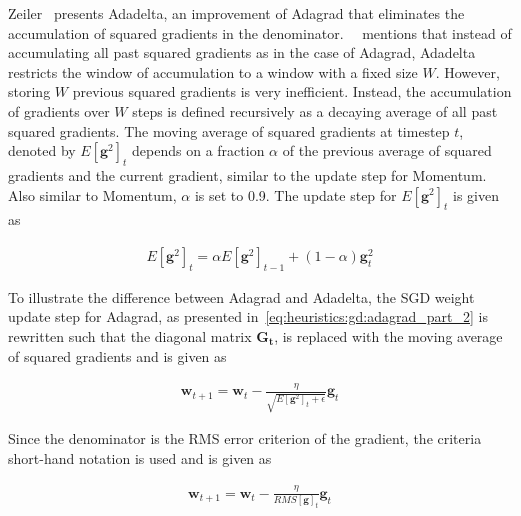 Zeiler~\cite{ref:zeiler:2012} presents \acs{Adadelta}, an improvement of \acs{Adagrad} that eliminates the accumulation of squared gradients in the denominator.~\citeauthor{ref:ruder:2016}~\cite{ref:ruder:2016} mentions that instead of accumulating all past squared gradients as in the case of \acs{Adagrad}, \acs{Adadelta} restricts the window of accumulation to a window with a fixed size $W$. However, storing $W$ previous squared gradients is very inefficient. Instead, the accumulation of gradients over $W$ steps is defined recursively as a decaying average of all past squared gradients. The moving average of squared gradients at timestep $t$, denoted by $E[\boldsymbol{g}^{2}]_{t}$  depends on a fraction $\alpha$ of the previous average of squared gradients and the current gradient, similar to the update step for \acs{Momentum}. Also similar to \acs{Momentum}, $\alpha$ is set to 0.9. The update step for $E[\boldsymbol{g}^{2}]_{t}$ is given as

\begin{equation}
      \label{eq:heuristics:gd:adadelta_part_1}
      \begin{split}
            E[\boldsymbol{g}^{2}]_{t} = \alpha E[\boldsymbol{g}^{2}]_{t - 1} + (1 - \alpha)\boldsymbol{g}_{t}^{2}
      \end{split}
\end{equation}

To illustrate the difference between \acs{Adagrad} and \acs{Adadelta}, the \acs{SGD} weight update step for \acs{Adagrad}, as presented in~\eqref{eq:heuristics:gd:adagrad_part_2} is rewritten such that the diagonal matrix $\boldsymbol{G_{t}}$, is replaced with the moving average of squared gradients and is given as

\begin{equation}
      \label{eq:heuristics:gd:adadelta_part_2}
      \begin{split}
            \boldsymbol{w}_{t+1} = \boldsymbol{w}_{t} - \frac{\eta}{\sqrt{E[\boldsymbol{g}^{2}]_{t} + \epsilon}} \boldsymbol{g}_{t}
      \end{split}
\end{equation}

Since the denominator is the \acf{RMS} error criterion of the gradient, the criteria short-hand notation is used and is given as

\begin{equation}
      \label{eq:heuristics:gd:adadelta_part_3}
      \begin{split}
            \boldsymbol{w}_{t+1} = \boldsymbol{w}_{t} - \frac{\eta}{RMS[\boldsymbol{g}]_{t}} \boldsymbol{g}_{t}
      \end{split}
\end{equation}

